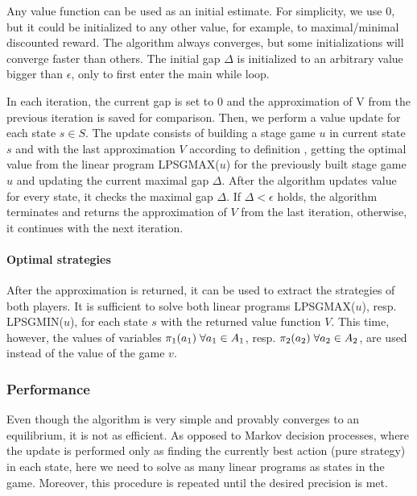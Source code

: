 \documentclass[../main.tex]{subfiles}
\begin{document}
Any value function can be used as an initial estimate.
For simplicity, we use $0$, but it could be initialized to any other value, for example, to maximal/minimal discounted reward.
The algorithm always converges, but some initializations will converge faster than others.
The initial gap $\Delta$ is initialized to an arbitrary value bigger than $\epsilon$, only to first enter the main while loop.

In each iteration, the current gap is set to $0$ and the approximation of V from the previous iteration is saved for comparison.
Then, we perform a value update for each state $s \in S$.
The update consists of building a stage game $u$ in current state $s$ and with the last approximation $V$ according to definition , getting the optimal value from the linear program LPSGMAX($u$)  for the previously built stage game $u$ and updating the current maximal gap $\Delta$.
After the algorithm updates value for every state, it checks the maximal gap $\Delta$.
If $\Delta < \epsilon$ holds, the algorithm terminates and returns the approximation of $V$ from the last iteration, otherwise, it continues with the next iteration.

\paragraph{Optimal strategies}
After the approximation is returned, it can be used to extract the strategies of both players.
It is sufficient to solve both linear programs LPSGMAX($u$), resp. LPSGMIN($u$), for each state $s$ with the returned value function $V$.
This time, however, the values of variables $\pi_{1}(a_1)\;\forall a_1 \in A_1$, resp. $\pi_{2}(a_2)\;\forall a_2 \in A_2$, are used instead of the value of the game $v$.

\subsubsection{Performance}\label{standard:sg:valueiter:performance}
Even though the algorithm is very simple and provably converges to an equilibrium, it is not as efficient.
As opposed to Markov decision processes, where the update is performed only as finding the currently best action (pure strategy) in each state, here we need to solve as many linear programs as states in the game.
Moreover, this procedure is repeated until the desired precision is met.
\end{document}
